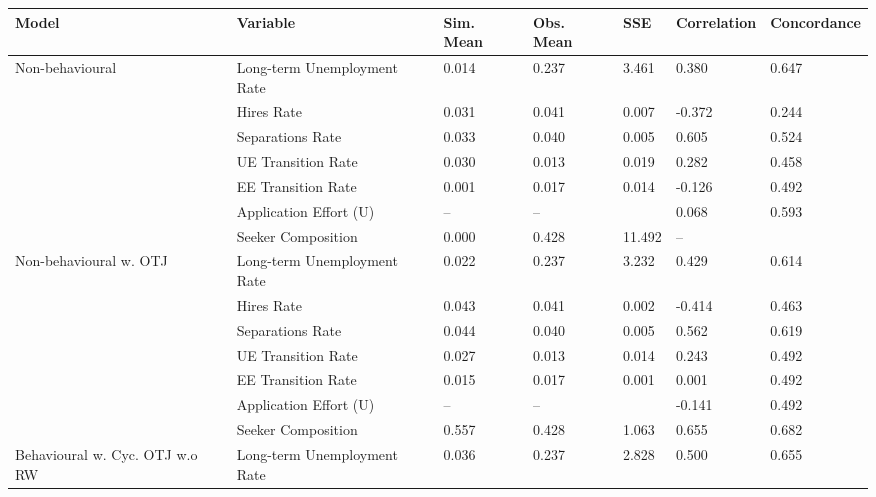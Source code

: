 \begin{adjustbox}{width=\textwidth}
\begin{tabular}{lllllll}
\toprule
Model & Variable & Sim. Mean & Obs. Mean & SSE & Correlation & Concordance \\
\midrule
\cellcolor{modelNonbehavioural!25}Non-behavioural & Long-term Unemployment Rate & 0.014 & 0.237 & 3.461 & \cellcolor{red!25}0.380 & 0.647 \\
\cellcolor{modelNonbehavioural!25} & Hires Rate & 0.031 & 0.041 & 0.007 & \cellcolor{orange!25}-0.372 & 0.244 \\
\cellcolor{modelNonbehavioural!25} & Separations Rate & 0.033 & 0.040 & 0.005 & \cellcolor{yellow!25}0.605 & 0.524 \\
\cellcolor{modelNonbehavioural!25} & UE Transition Rate & 0.030 & 0.013 & 0.019 & \cellcolor{orange!25}0.282 & 0.458 \\
\cellcolor{modelNonbehavioural!25} & EE Transition Rate & 0.001 & 0.017 & 0.014 & \cellcolor{red!25}-0.126 & 0.492 \\
\cellcolor{modelNonbehavioural!25} & Application Effort (U) & -- & -- &  & \cellcolor{green!25}0.068 & 0.593 \\
\cellcolor{modelNonbehavioural!25} & Seeker Composition & 0.000 & 0.428 & 11.492 & -- &  \\
\cellcolor{modelNonbehaviouralwOTJ!25}Non-behavioural w. OTJ & Long-term Unemployment Rate & 0.022 & 0.237 & 3.232 & \cellcolor{yellow!25}0.429 & 0.614 \\
\cellcolor{modelNonbehaviouralwOTJ!25} & Hires Rate & 0.043 & 0.041 & 0.002 & \cellcolor{red!25}-0.414 & 0.463 \\
\cellcolor{modelNonbehaviouralwOTJ!25} & Separations Rate & 0.044 & 0.040 & 0.005 & \cellcolor{red!25}0.562 & 0.619 \\
\cellcolor{modelNonbehaviouralwOTJ!25} & UE Transition Rate & 0.027 & 0.013 & 0.014 & \cellcolor{red!25}0.243 & 0.492 \\
\cellcolor{modelNonbehaviouralwOTJ!25} & EE Transition Rate & 0.015 & 0.017 & 0.001 & \cellcolor{green!70!yellow!25}0.001 & 0.492 \\
\cellcolor{modelNonbehaviouralwOTJ!25} & Application Effort (U) & -- & -- &  & \cellcolor{red!25}-0.141 & 0.492 \\
\cellcolor{modelNonbehaviouralwOTJ!25} & Seeker Composition & 0.557 & 0.428 & 1.063 & \cellcolor{green!25}0.655 & 0.682 \\
\cellcolor{modelBehaviouralwCycOTJwoRW!25}Behavioural w. Cyc. OTJ w.o RW & Long-term Unemployment Rate & 0.036 & 0.237 & 2.828 & \cellcolor{green!70!yellow!25}0.500 & 0.655 \\

\end{tabular}
\end{adjustbox}
